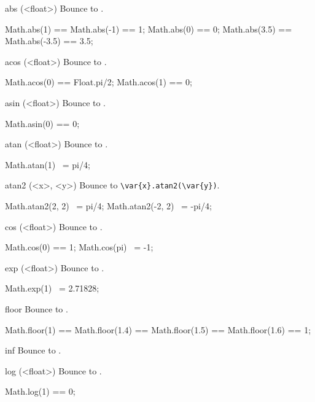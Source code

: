 \begin{urbiscriptapi}
\item[abs](<float>)%
  Bounce to .
\begin{urbiassert}
Math.abs(1) == Math.abs(-1) == 1;
Math.abs(0) == 0;
Math.abs(3.5) == Math.abs(-3.5) == 3.5;
\end{urbiassert}

\item[acos](<float>)%
  Bounce to .
\begin{urbiassert}
Math.acos(0) == Float.pi/2;
Math.acos(1) == 0;
\end{urbiassert}

\item[asin](<float>)%
  Bounce to .
\begin{urbiassert}
Math.asin(0) == 0;
\end{urbiassert}

\item[atan](<float>)%
  Bounce to .
\begin{urbiassert}
Math.atan(1) ~= pi/4;
\end{urbiassert}

\item[atan2](<x>, <y>)%
  Bounce to \lstinline|\var{x}.atan2(\var{y})|.
\begin{urbiassert}
Math.atan2(2, 2) ~= pi/4;
Math.atan2(-2, 2) ~= -pi/4;
\end{urbiassert}

\item[cos](<float>)%
  Bounce to .
\begin{urbiassert}
Math.cos(0) == 1;
Math.cos(pi) ~= -1;
\end{urbiassert}

\item[exp](<float>)%
  Bounce to .
\begin{urbiassert}
Math.exp(1) ~= 2.71828;
\end{urbiassert}

\item[floor] Bounce to .
\begin{urbiassert}
Math.floor(1) == Math.floor(1.4) == Math.floor(1.5) ==  Math.floor(1.6) == 1;
\end{urbiassert}

\item[inf]
  Bounce to .

\item[log](<float>)%
  Bounce to .
\begin{urbiassert}
Math.log(1) == 0;
\end{urbiassert}


\end{urbiscriptapi}
